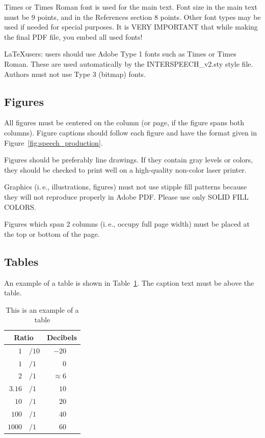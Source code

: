 \documentclass[a4paper]{article}
\begin{document}
Times or Times Roman font is used for the main text. Font size in the main text must be 9 points, and in the References section 8 points. Other font types may be used if needed for special purposes. It is VERY IMPORTANT that while making the final PDF file, you embed all used fonts!

\LaTeX users: users should use Adobe Type 1 fonts such as Times or Times Roman. These are used automatically by the INTERSPEECH\_v2.sty style file. Authors must not use Type 3 (bitmap) fonts.

\subsection{Figures}

All figures must be centered on the column (or page, if the figure spans both columns). Figure captions should follow each figure and have the format given in Figure~\ref{fig:speech_production}.

Figures should be preferably line drawings. If they contain gray levels or colors, they should be checked to print well on a high-quality non-color laser printer.

Graphics (i.\,e., illustrations, figures) must not use stipple fill patterns because they will not reproduce properly in Adobe PDF. Please use only SOLID FILL COLORS.

Figures which span 2 columns (i.\,e., occupy full page width) must be placed at the top or bottom of the page.

\subsection{Tables}

An example of a table is shown in Table~\ref{tab:example}. The caption text must be above the table.

\begin{table}[th]
  \caption{This is an example of a table}
  \label{tab:example}
  \centering
  \begin{tabular}{ r@{}l  r }
    \toprule
    \multicolumn{2}{c}{\textbf{Ratio}} & 
                                         \multicolumn{1}{c}{\textbf{Decibels}} \\
    \midrule
    $1$                       & $/10$ & $-20$~~~             \\
    $1$                       & $/1$  & $0$~~~               \\
    $2$                       & $/1$  & $\approx 6$~~~       \\
    $3.16$                    & $/1$  & $10$~~~              \\
    $10$                      & $/1$  & $20$~~~              \\
    $100$                     & $/1$  & $40$~~~              \\
    $1000$                    & $/1$  & $60$~~~              \\
    \bottomrule
  \end{tabular}
  
\end{table}
\end{document}
